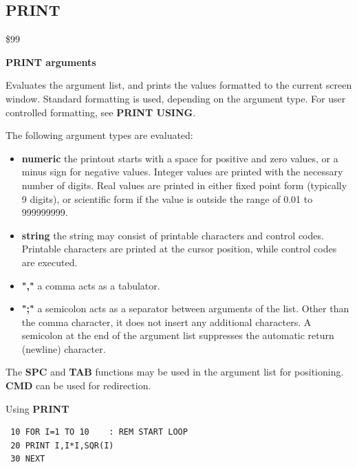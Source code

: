 \subsection{PRINT}
\begin{description}[leftmargin=2cm,style=nextline]
\item [Token:] \$99
\item [Format:] {\bf PRINT arguments}
\item [Usage:]  Evaluates the argument list, and prints the values
                formatted to the current screen window.
                Standard formatting is used, depending on the
                argument type. For user controlled formatting,
                see {\bf PRINT USING}.

                The following argument types are evaluated:
                \begin{itemize}
                    \item {\bf numeric} the printout starts with a space
                    for positive and zero values, or a minus sign for
                    negative values. Integer values are printed with
                    the necessary number of digits. Real values are
                    printed in either fixed point form (typically
                    9 digits), or scientific form if the value is
                    outside the range of 0.01 to 999999999.

                    \item {\bf string} the string may consist of printable
                    characters and control codes. Printable characters
                    are printed at the cursor position, while control
                    codes are executed.

                    \item {\bf ","} a comma acts as a tabulator.

                    \item {\bf ";"} a semicolon acts as a separator between
                    arguments of the list. Other than the comma character,
                    it does not insert any additional characters.
                    A semicolon at the end of the argument list suppresses
                    the automatic return (newline) character.
                \end{itemize}
\item [Remarks:] The {\bf SPC} and {\bf TAB} functions
                 may be used in the argument list
                 for positioning.
                 {\bf CMD} can be used for redirection.

\item [Example:] Using {\bf PRINT}

\begin{tcolorbox}[colback=black,coltext=white]
\verbatimfont{\codefont}
\begin{verbatim}
 10 FOR I=1 TO 10    : REM START LOOP
 20 PRINT I,I*I,SQR(I)
 30 NEXT
\end{verbatim}
\end{tcolorbox}
\end{description}

